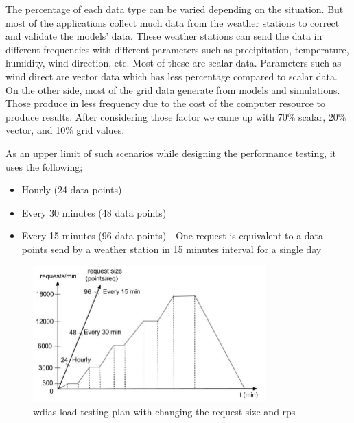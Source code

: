 The percentage of each data type can be varied depending on the situation. But most of the applications collect much data from the weather stations to correct and validate the models' data. These weather stations can send the data in different frequencies with different parameters such as precipitation, temperature, humidity, wind direction, etc. Most of these are scalar data. Parameters such as wind direct are vector data which has less percentage compared to scalar data. On the other side, most of the grid data generate from models and simulations. Those produce in less frequency due to the cost of the computer resource to produce results. After considering those factor we came up with 70\% scalar, 20\% vector, and 10\% grid values.

As an upper limit of such scenarios while designing the performance testing, it uses the following;
\begin{itemize}
    \item Hourly (24 data points) 
    \item Every 30 minutes (48 data points)
    \item Every 15 minutes (96 data points) - One request is equivalent to a data points send by a weather station in 15 minutes interval for a single day
\end{itemize}

\begin{figure}[htp]
    \centering
    \includegraphics[width=0.8\textwidth]{results/work_load/performance_study_v4.jpg}
    \caption{\acrshort{wdias} load testing plan with changing the request size and \acrshort{rps}}
    \label{fi:performance_study_load}
\end{figure}

